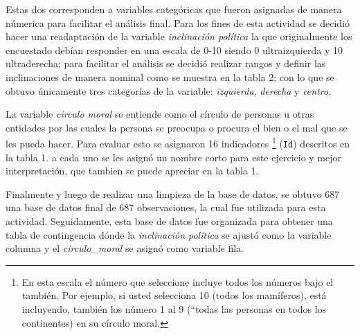 \documentclass[
]{article}
\begin{document}
Estas dos corresponden a variables categóricas que fueron asignadas de
manera númerica para facilitar el análisis final. Para los fines de esta
actividad se decidió hacer una readaptación de la variable
\emph{inclinación política} la que originalmente los encuestado debían
responder en una escala de 0-10 siendo 0 ultraizquierda y 10
ultraderecha; para facilitar el análisis se decidió realizar rangos y
definir las inclinaciones de manera nominal como se muestra en la tabla
2; con lo que se obtuvo únicamente tres categorías de la variable:
\emph{izquierda}, \emph{derecha} y \emph{centro.}

La variable \emph{circulo moral} se entiende como el círculo de personas
u otras entidades por las cuales la persona se preocupa o procura el
bien o el mal que se les pueda hacer. Para evaluar esto se asignaron 16
indicadores \footnote{En esta escala el número que seleccione incluye
  todos los números bajo el también. Por ejemplo, si usted selecciona 10
  (todos los mamíferos), está incluyendo, también los número 1 al 9
  (``todas las personas en todos los continentes) en su círculo moral.}
(\texttt{Id}) descritos en la tabla 1. a cada uno se les asignó un
nombre corto para este ejercicio y mejor interpretación, que tambien se
puede apreciar en la tabla 1.

Finalmente y luego de realizar una limpieza de la base de datos, se
obtuvo 687 una base de datos final de 687 observaciones, la cual fue
utilizada para esta actividad. Seguidamente, esta base de datos fue
organizada para obtener una tabla de contingencia dónde la
\emph{inclinación política} se ajustó como la variable columna y el
\emph{circulo\_moral} se asignó como variable fila.
\end{document}
